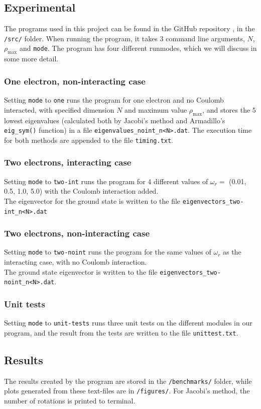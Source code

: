 \documentclass{article}
\begin{document}
\subsection{Experimental}
The programs used in this project can be found in the GitHub repository \cite{Github}, in the \texttt{/src/} folder. When running the program, it takes 3 command line arguments, $N$, $\rho_{\text{max}}$ and \texttt{mode}. The program has four different runmodes, which we will discuss in some more detail.
\subsubsection{One electron, non-interacting case}
Setting \texttt{mode} to \texttt{one} runs the program for one electron and no Coulomb interacted, with specified dimension $N$ and maximum value $\rho_{\text{max}}$, and stores the 5 lowest eigenvalues (calculated both by Jacobi's method and Armadillo's \texttt{eig\_sym()} function) in a file \texttt{eigenvalues\_noint\_n<N>.dat}. The execution time for both methods are appended to the file \texttt{timing.txt}.
\subsubsection{Two electrons, interacting case}
Setting \texttt{mode} to \texttt{two-int} runs the program for 4 different values of $\omega_r =$ (0.01, 0.5, 1.0, 5.0) with the Coulomb interaction added.\\The eigenvector for the ground state is written to the file \texttt{eigenvectors\_two-int\_n<N>.dat}
\subsubsection{Two electrons, non-interacting case}
Setting \texttt{mode} to \texttt{two-noint} runs the program for the same values of $\omega_r$ as the interacting case, with no Coulomb interaction.\\The ground state eigenvector is written to the file \texttt{eigenvectors\_two-noint\_n<N>.dat}.
\subsubsection{Unit tests}
Setting \texttt{mode} to \texttt{unit-tests} runs three unit tests on the different modules in our program, and the result from the tests are written to the file \texttt{unittest.txt}.
\subsection{Results}
The results created by the program are stored in the \texttt{/benchmarks/} folder, while plots generated from these text-files are in \texttt{/figures/}. For Jacobi's method, the number of rotations is printed to terminal.
\end{document}
